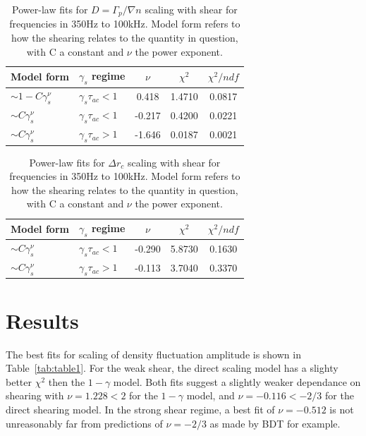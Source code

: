 \documentclass[aip,pop,amsmath,amssymb,preprint,superscriptaddress]{revtex4-1} %
\begin{document}
\begin{table}
\caption{\label{tab:table5}Power-law fits for $D = \Gamma_{p}/\nabla{n}$ scaling with shear for frequencies in 350Hz to 100kHz. Model form refers to how the shearing relates to the quantity in question, with C a constant and $\nu$ the power exponent.}
\begin{ruledtabular}
\begin{tabular}{llccc}
Model form&$\gamma_{s}$ regime&$\nu$&$\chi^2$&$\chi^2/ndf$\\
\hline
$\sim 1-C\gamma_{s}^\nu$&$\gamma_{s}\tau_{ac}<1$ &0.418   &1.4710    &0.0817\\
$\sim C\gamma_{s}^\nu$&$\gamma_{s}\tau_{ac}<1$   &-0.217  &0.4200    &0.0221\\
$\sim C\gamma_{s}^\nu$&$\gamma_{s}\tau_{ac}>1$   &-1.646  &0.0187    &0.0021\\
\end{tabular}
\end{ruledtabular}
\end{table}

\begin{table}
\caption{\label{tab:table6}Power-law fits for $\Delta r_{c}$ scaling with shear for frequencies in 350Hz to 100kHz. Model form refers to how the shearing relates to the quantity in question, with C a constant and $\nu$ the power exponent.}
\begin{ruledtabular}
\begin{tabular}{llccc}
Model form&$\gamma_{s}$ regime&$\nu$&$\chi^2$&$\chi^2/ndf$\\
\hline
$\sim C\gamma_{s}^\nu$&$\gamma_{s}\tau_{ac}<1$ &-0.290 &5.8730 &0.1630\\
$\sim C\gamma_{s}^\nu$&$\gamma_{s}\tau_{ac}>1$ &-0.113 &3.7040 &0.3370\\
\end{tabular}
\end{ruledtabular}
\end{table}



\section{Results}

The best fits for scaling of density fluctuation amplitude is shown in Table~\ref{tab:table1}. For the weak shear, the direct scaling model has a slighty better $\chi^{2}$ then the $1-\gamma$ model. Both fits suggest a slightly weaker dependance on shearing with $\nu = 1.228 < 2$ for the $1-\gamma$ model, and $\nu = -0.116 < -2/3$ for the direct shearing model. In the strong shear regime, a best fit of $\nu = -0.512$ is not unreasonably far from predictions of $\nu = -2/3$ as made by BDT for example.
\end{document}
